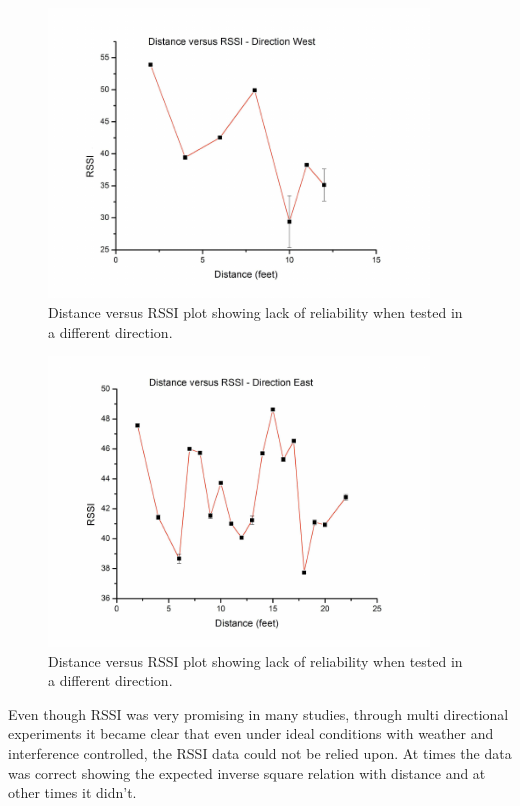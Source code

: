 \documentclass[10pt,a4paper]{article}
\begin{document}
\begin{figure}[H]
\centering
\includegraphics[width=0.9\textwidth]{West.pdf}
\caption{Distance versus RSSI plot showing lack of
reliability when tested in a different direction.\cite{RSSI}} 
\label{West}
\end{figure}

\begin{figure}[H]
\centering
\includegraphics[width=0.9\textwidth]{East.pdf}
\caption{Distance versus RSSI plot showing lack of
reliability when tested in a different direction.\cite{RSSI}} 
\label{East}
\end{figure}
\newpage


Even though RSSI was very promising in many studies, through multi directional experiments it became clear that even under ideal conditions with weather and interference controlled, the RSSI data could not be relied upon. At times the data was correct showing the expected inverse square relation with distance and at other times it didn't.\cite{RSSI}
\end{document}
